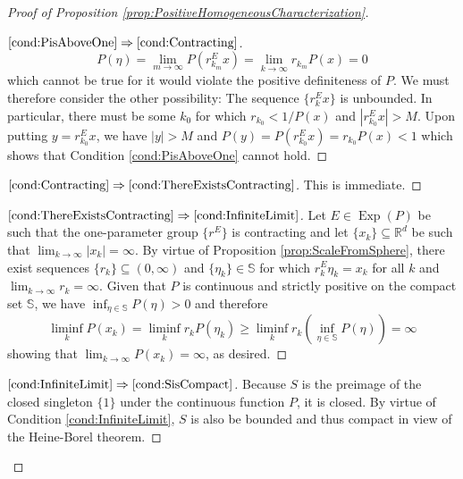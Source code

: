 \documentclass[11pt]{article}
\theoremstyle{remark}
\newcommand*{\myproofname}{Proof}
\newenvironment{subproof}[1][\myproofname]{\begin{proof}[#1]\renewcommand*{\qedsymbol}{$\mathbin{/\mkern-6mu/}$}}{\end{proof}}
\newcommand\Exp{\operatorname{Exp}}
\begin{document}
\begin{proof}[Proof of Proposition \ref{prop:PositiveHomogeneousCharacterization}]
\begin{subproof}[$\ref{cond:PisAboveOne}\Rightarrow\ref{cond:Contracting}$]
\begin{equation*}
P(\eta)=\lim_{m\to\infty}P(r_{k_m}^Ex)=\lim_{k\to\infty}r_{k_m}P(x)=0
\end{equation*}
which cannot be true for it would violate the positive definiteness of $P$. We must therefore consider the other possibility: The sequence $\{r_k^Ex\}$ is unbounded. In particular, there must be some $k_0$ for which $r_{k_0}<1/P(x)$ and $|r_{k_0}^Ex|>M$. Upon putting $y=r_{k_0}^Ex$, we have $|y|>M$ and  $P(y)=P(r_{k_0}^Ex)=r_{k_0}P(x)<1$ which shows that Condition \ref{cond:PisAboveOne} cannot hold.
\end{subproof}
\begin{subproof}[$\ref{cond:Contracting}\Rightarrow\ref{cond:ThereExistsContracting}$] This is immediate.
\end{subproof}
\begin{subproof}[$\ref{cond:ThereExistsContracting}\Rightarrow\ref{cond:InfiniteLimit}$]
Let $E\in\Exp(P)$ be such that the one-parameter group $\{r^E\}$ is contracting and let $\{x_k\}\subseteq\mathbb{R}^d$ be such that $\lim_{k\to\infty}|x_k|=\infty$. By virtue of Proposition \ref{prop:ScaleFromSphere}, there exist sequences $\{r_k\}\subseteq (0,\infty)$ and $\{\eta_k\}\in\mathbb{S}$ for which $r_k^E\eta_k=x_k$ for all $k$ and $\lim_{k\to\infty}r_k=\infty$. Given that $P$ is continuous and strictly positive on the compact set $\mathbb{S}$, we have $\inf_{\eta\in\mathbb{S}}P(\eta)>0$ and therefore
\begin{equation*}
\liminf_k P(x_k)=\liminf_k r_kP(\eta_k)\geq \liminf_k r_k\left(\inf_{\eta\in\mathbb{S}}P(\eta)\right)=\infty
\end{equation*}
showing that $\lim_{k\to\infty} P(x_k)=\infty$, as desired.
\end{subproof}
\begin{subproof}[$\ref{cond:InfiniteLimit}\Rightarrow\ref{cond:SisCompact}$]
Because $S$ is the preimage of the closed singleton $\{1\}$ under the continuous function $P$, it is closed. By virtue of Condition \ref{cond:InfiniteLimit}, $S$ is also be bounded and thus compact in view of the Heine-Borel theorem.
\end{subproof}
\end{proof}
\end{document}

